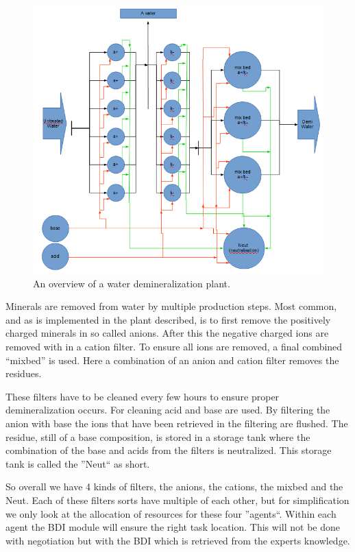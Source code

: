 \begin{figure}
	\centering
	\includegraphics[width=1\linewidth]{img/demi-plant}
	\caption{An overview of a water demineralization plant.}
	\label{fig:demi-plant}
\end{figure}

Minerals are removed from water by multiple production steps. Most common, and as is implemented in the plant described, is to first remove the positively charged minerals in so called anions. After this the negative charged ions are removed with in a cation filter. To ensure all ions are removed, a final combined ``mixbed'' is used. Here a combination of an anion and cation filter removes the residues.

These filters have to be cleaned every few hours to ensure proper demineralization occurs. For cleaning acid and base are used. By filtering the anion with base the ions that have been retrieved in the filtering are flushed. The residue, still of a base composition, is stored in a storage tank where the combination of the base and acids from the filters is neutralized. This storage tank is called the ''Neut`` as short.

So overall we have 4 kinds of filters, the anions, the cations, the mixbed and the Neut. Each of these filters sorts have multiple of each other, but for simplification we only look at the allocation of resources for these four ''agents``. Within each agent the BDI module will ensure the right task location. This will not be done with negotiation but with the BDI which is retrieved from the experts knowledge.


